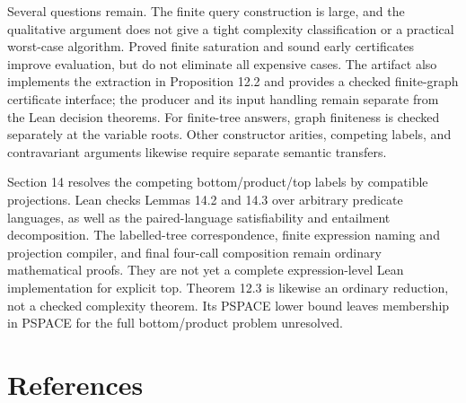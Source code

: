 \documentclass[
  11pt,
  a4paper,
]{article}
\begin{document}
Several questions remain. The finite query construction is large, and
the qualitative argument does not give a tight complexity classification
or a practical worst-case algorithm. Proved finite saturation and sound
early certificates improve evaluation, but do not eliminate all
expensive cases. The artifact also implements the extraction in
Proposition 12.2 and provides a checked finite-graph certificate
interface; the producer and its input handling remain separate from the
Lean decision theorems. For finite-tree answers, graph finiteness is
checked separately at the variable roots. Other constructor arities,
competing labels, and contravariant arguments likewise require separate
semantic transfers.

Section 14 resolves the competing bottom/product/top labels by
compatible projections. Lean checks Lemmas 14.2 and 14.3 over arbitrary
predicate languages, as well as the paired-language satisfiability and
entailment decomposition. The labelled-tree correspondence, finite
expression naming and projection compiler, and final four-call
composition remain ordinary mathematical proofs. They are not yet a
complete expression-level Lean implementation for explicit top. Theorem
12.3 is likewise an ordinary reduction, not a checked complexity
theorem. Its PSPACE lower bound leaves membership in PSPACE for the full
bottom/product problem unresolved.

\newpage

\section{References}\label{references}
\end{document}
